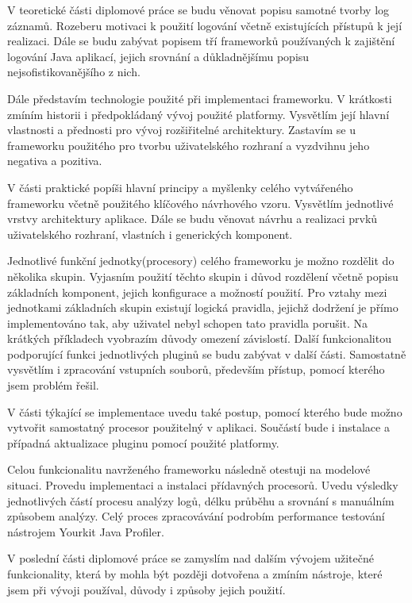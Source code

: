 \documentclass[ing,male,java,dept460]{diploma}		%
\begin{document}
\par V teoretické části diplomové práce se budu věnovat popisu samotné tvorby log záznamů. Rozeberu motivaci k použití logování včetně existujících přístupů k její realizaci. Dále se budu zabývat popisem tří frameworků používaných k zajištění logování Java aplikací, jejich srovnání a důkladnějšímu popisu nejsofistikovanějšího z nich.
\par Dále představím technologie použité při implementaci frameworku. V krátkosti zmíním historii i předpokládaný vývoj použité platformy. Vysvětlím její hlavní vlastnosti a přednosti pro vývoj rozšiřitelné architektury. Zastavím se u frameworku použitého pro tvorbu uživatelského rozhraní a vyzdvihnu jeho negativa a pozitiva.

\par V části praktické popíši hlavní principy a myšlenky celého vytvářeného frameworku včetně použitého klíčového návrhového vzoru. Vysvětlím jednotlivé vrstvy architektury aplikace. Dále se budu věnovat návrhu a realizaci prvků uživatelského rozhraní, vlastních i generických komponent.
\par Jednotlivé funkční jednotky(procesory) celého frameworku je možno rozdělit do několika skupin. Vyjasním použití těchto skupin i důvod rozdělení včetně popisu základních komponent, jejich konfigurace a možností použití. Pro vztahy mezi jednotkami základních skupin existují logická pravidla, jejichž dodržení je přímo implementováno tak, aby uživatel nebyl schopen tato pravidla porušit. Na krátkých příkladech vyobrazím důvody omezení závislostí. Další funkcionalitou podporující funkci jednotlivých pluginů se budu zabývat v další části. Samostatně vysvětlím i zpracování vstupních souborů, především přístup, pomocí kterého jsem problém řešil.
\par V části týkající se implementace uvedu také postup, pomocí kterého bude možno vytvořit samostatný procesor použitelný v aplikaci. Součástí bude i instalace a případná aktualizace pluginu pomocí použité platformy.

\par Celou funkcionalitu navrženého frameworku následně otestuji na modelové situaci. Provedu implementaci a instalaci přídavných procesorů. Uvedu výsledky jednotlivých částí procesu analýzy logů, délku průběhu a srovnání s manuálním způsobem analýzy. Celý proces zpracovávání podrobím performance testování nástrojem Yourkit Java Profiler.
\par V poslední části diplomové práce se zamyslím nad dalším vývojem užitečné funkcionality, která by mohla být později dotvořena a zmíním nástroje, které jsem při vývoji používal, důvody i způsoby jejich použití.
\end{document}
